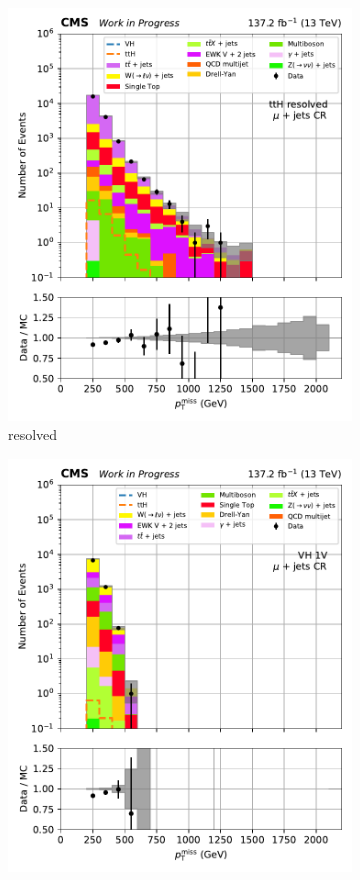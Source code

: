 \begin{figure}[htbp]
\begin{subfigure}[b]{0.24\textwidth}
        \includegraphics[width=\textwidth]{figures/region_plots/2016to18/region_1/ttH_resolved.pdf}
        \caption{\ttH resolved}
    \end{subfigure}
    \begin{subfigure}[b]{0.24\textwidth}
        \includegraphics[width=\textwidth]{figures/region_plots/2016to18/region_1/VH_1V.pdf}

\end{subfigure}
\end{figure}
